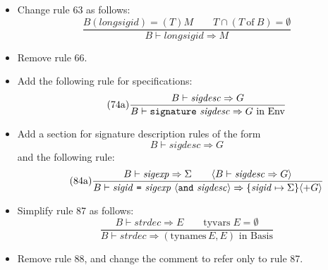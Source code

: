 \documentclass[twoside,titlepage]{article}
\begin{document}
\begin{appendix}
\begin{itemize}
\item Change rule 63 as follows:
  \begin{equation}
  \tag{63}
  \frac{
  B(\mathit{longsigid}) = (T)M
  \qquad
  T \cap (T~\mbox{of}~B) = \emptyset
  }{
  B \vdash \mathit{longsigid} \Rightarrow M
  }
  \end{equation}

\item Remove rule 66.

\item Add the following rule for specifications:
  \begin{equation}
  \tag{74a}
  \frac{
  B \vdash \mathit{sigdesc} \Rightarrow G
  }{
  B \vdash {\tt{signature}}~\mathit{sigdesc} \Rightarrow \mbox{$G$ in Env}
  }
  \end{equation}

\item Add a section for signature description rules of the form
  $$
  \boxed{B \vdash \mathit{sigdesc} \Rightarrow G}
  $$
  and the following rule:
  \begin{equation}
  \tag{84a}
  \frac{
  B \vdash \mathit{sigexp} \Rightarrow \Sigma
  \qquad
  \langle B \vdash \mathit{sigdesc} \Rightarrow G\rangle
  }{
  B \vdash \mathit{sigid}~\mbox{\tt=}~\mathit{sigexp}~\langle{\tt{and}}~\mathit{sigdesc}\rangle \Rightarrow \{\mathit{sigid}\mapsto\Sigma\}\langle+ G\rangle
  }
  \end{equation}

\item Simplify rule 87 as follows:
  \begin{equation}
  \tag{87}
  \frac{
  B \vdash \mathit{strdec} \Rightarrow E
  \qquad
  \mbox{tyvars}\;E = \emptyset
  }{
  B \vdash \mathit{strdec} \Rightarrow \mbox{$(\mbox{tynames}\,E, E)$ in Basis}
  }
  \end{equation}

\item Remove rule 88, and change the comment to refer only to rule 87.
\end{itemize}


\end{appendix}
\end{document}
